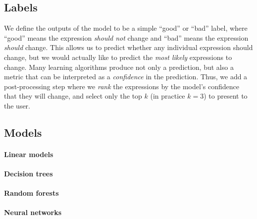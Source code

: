 \subsection{Labels}
\label{sec:labels}
We define the outputs of the model to be a simple ``good'' or ``bad''
label, where ``good'' means the expression \emph{should not} change and
``bad'' means the expression \emph{should} change.
%
This allows us to predict whether any individual expression should
change, but we would actually like to predict the \emph{most likely}
expressions to change.
%
Many learning algorithms produce not only a prediction, but also a
metric that can be interpreted as a \emph{confidence} in the prediction.
%
Thus, we add a post-processing step where we \emph{rank} the expressions
by the model's confidence that they will change, and select only the top
$k$ (in practice $k=3$) to present to the user.

\subsection{Models}
\label{sec:models}

\paragraph{Linear models}

\paragraph{Decision trees}

\paragraph{Random forests}

\paragraph{Neural networks}







